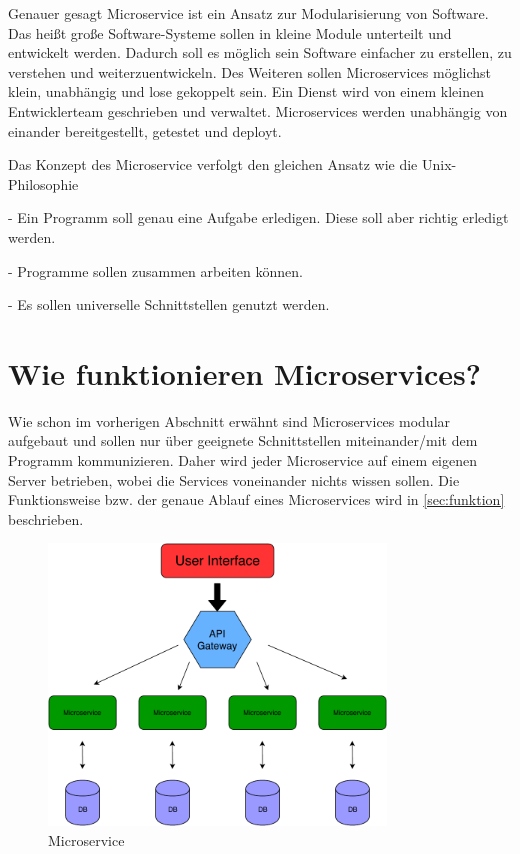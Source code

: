 Genauer gesagt Microservice ist ein Ansatz zur Modularisierung von Software. Das heißt große Software-Systeme sollen in kleine Module unterteilt und entwickelt werden.\newline
Dadurch soll es möglich sein Software einfacher zu erstellen, zu verstehen und weiterzuentwickeln. Des Weiteren sollen Microservices möglichst klein, unabhängig und lose gekoppelt sein. Ein Dienst wird von einem kleinen Entwicklerteam geschrieben und verwaltet. Microservices werden unabhängig von einander bereitgestellt, getestet und deployt.\newpage 

Das Konzept des Microservice verfolgt den gleichen Ansatz wie die Unix-Philosophie\cite{unixphilosophie}\newline
\begin{description}
 \item - Ein Programm soll genau eine Aufgabe erledigen. Diese soll aber richtig erledigt werden.
 \item - Programme sollen zusammen arbeiten können.
 \item - Es sollen universelle Schnittstellen genutzt werden.
\end{description}


\chapter{Wie funktionieren Microservices?}\label{sec:funktionsweise}

Wie schon im vorherigen Abschnitt erwähnt sind Microservices modular aufgebaut und sollen nur über geeignete Schnittstellen miteinander/mit dem Programm kommunizieren. Daher wird jeder Microservice auf einem eigenen Server betrieben, wobei die Services voneinander nichts wissen sollen. Die Funktionsweise bzw. der genaue Ablauf eines Microservices wird in \ref{sec:funktion} beschrieben.\newline\newline

\begin{figure}[bth]
    \centering
    \includegraphics[width=0.8\textwidth]{Chapters/Bilder/Microservices.pdf}
    \caption{Microservice}
   \label{fig:microservice}
  \end{figure}
  
